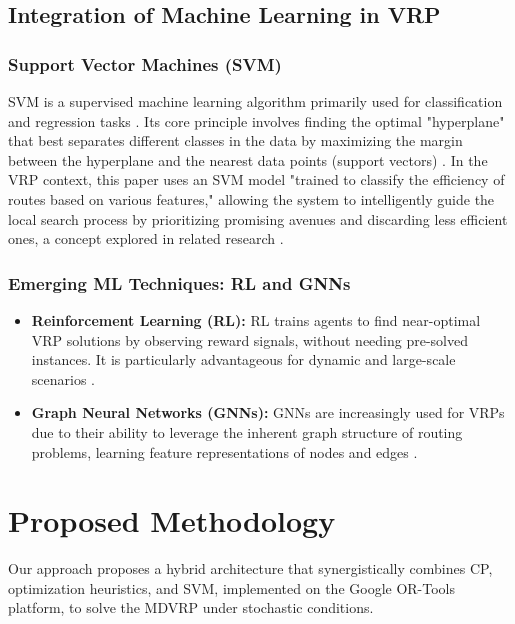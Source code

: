 \documentclass[conference]{IEEEtran} %
\begin{document}
\subsection{Integration of Machine Learning in VRP}
\subsubsection{Support Vector Machines (SVM)}
SVM is a supervised machine learning algorithm primarily used for classification and regression tasks \cite{cortes1995support}. Its core principle involves finding the optimal "hyperplane" that best separates different classes in the data by maximizing the margin between the hyperplane and the nearest data points (support vectors) \cite{vapnik2000nature}. In the VRP context, this paper uses an SVM model "trained to classify the efficiency of routes based on various features," allowing the system to intelligently guide the local search process by prioritizing promising avenues and discarding less efficient ones, a concept explored in related research \cite{sindhwani2023novel, kandula2021systematic}.

\subsubsection{Emerging ML Techniques: RL and GNNs}
\begin{itemize}
    \item \textbf{Reinforcement Learning (RL):} RL trains agents to find near-optimal VRP solutions by observing reward signals, without needing pre-solved instances. It is particularly advantageous for dynamic and large-scale scenarios \cite{gupta2022enhanced}.
    \item \textbf{Graph Neural Networks (GNNs):} GNNs are increasingly used for VRPs due to their ability to leverage the inherent graph structure of routing problems, learning feature representations of nodes and edges \cite{bi2024learning}.
\end{itemize}

\section{Proposed Methodology}

Our approach proposes a hybrid architecture that synergistically combines CP, optimization heuristics, and SVM, implemented on the Google OR-Tools platform, to solve the MDVRP under stochastic conditions.
\end{document}
